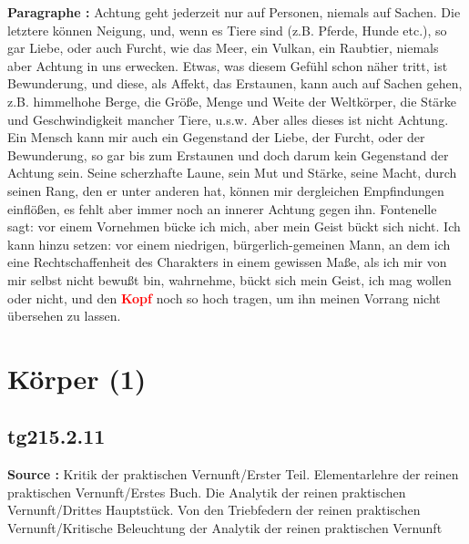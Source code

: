 \documentclass[a4paper,12pt,twoside]{book}
\newcommand{\match}[1]{\textcolor{red}{\textbf{#1}}}
\newcommand{\unnumberedsection}[1]{
	\section*{#1}
	\addcontentsline{toc}{section}{#1}
	\markright{#1}
}
\begin{document}
	\textbf{Paragraphe : }
	Achtung geht jederzeit nur auf Personen, niemals auf Sachen. Die letztere können Neigung, und, wenn es Tiere sind (z.B. Pferde, Hunde etc.), so gar Liebe, oder auch Furcht, wie das Meer, ein Vulkan, ein Raubtier, niemals aber Achtung in uns erwecken. Etwas, was diesem Gefühl schon näher tritt, ist Bewunderung, und diese, als Affekt, das Erstaunen, kann auch auf Sachen gehen, z.B. himmelhohe Berge, die Größe, Menge und Weite der Weltkörper, die Stärke und Geschwindigkeit mancher Tiere, u.s.w. Aber alles dieses ist nicht Achtung. Ein Mensch kann mir auch ein Gegenstand der Liebe, der Furcht, oder der Bewunderung, so gar bis zum Erstaunen und doch darum kein Gegenstand der Achtung sein. Seine scherzhafte Laune, sein Mut und Stärke, seine Macht, durch seinen Rang, den er unter anderen hat, können mir dergleichen Empfindungen einflößen, es fehlt aber immer noch an innerer Achtung gegen ihn. Fontenelle sagt: vor einem Vornehmen bücke ich mich, aber mein Geist bückt sich nicht. Ich kann hinzu setzen: vor einem niedrigen, bürgerlich-gemeinen Mann, an dem ich eine Rechtschaffenheit des Charakters in einem gewissen Maße, als ich mir von mir selbst nicht bewußt bin, wahrnehme, bückt sich mein Geist, ich mag wollen oder nicht, und den \match{Kopf} noch so hoch tragen, um ihn meinen Vorrang nicht übersehen zu lassen. 
	
	\unnumberedsection{Körper (1)} 
	\subsection*{tg215.2.11} 
	\textbf{Source : }Kritik der praktischen Vernunft/Erster Teil. Elementarlehre der reinen praktischen Vernunft/Erstes Buch. Die Analytik der reinen praktischen Vernunft/Drittes Hauptstück. Von den Triebfedern der reinen praktischen Vernunft/Kritische Beleuchtung der Analytik der reinen praktischen Vernunft\\  
	
\end{document}
